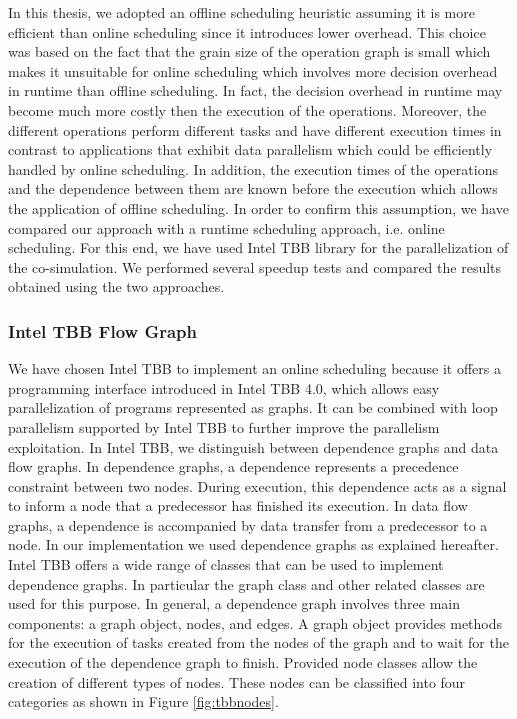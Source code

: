 In this thesis, we adopted an offline scheduling heuristic assuming it is more efficient than online scheduling since it introduces lower overhead. This choice was based on the fact that the grain size of the operation graph is small which makes it unsuitable for online scheduling which involves more decision overhead in runtime than offline scheduling. In fact, the decision overhead in runtime may become much more costly then the execution of the operations. Moreover, the different operations perform different tasks and have different execution times in contrast to applications that exhibit data parallelism which could be efficiently handled by online scheduling. In addition, the execution times of the operations and the dependence between them are known before the execution which allows the application of offline scheduling. In order to confirm this assumption, we have compared our approach with a runtime scheduling approach, i.e. online scheduling. For this end, we have used Intel TBB library for the parallelization of the co-simulation. We performed several speedup tests and compared the results obtained using the two approaches.

\subsubsection{Intel TBB Flow Graph}

We have chosen Intel TBB to implement an online scheduling because it offers a programming interface introduced in Intel TBB 4.0, which allows easy parallelization of programs represented as graphs. 
It can be combined with loop parallelism supported by Intel TBB to further improve the parallelism exploitation. 
In Intel TBB, we distinguish between dependence graphs and data flow graphs.
In dependence graphs, a dependence represents a precedence constraint between two nodes. During execution, this dependence acts as a signal to inform a node that a predecessor has finished its execution. 
In data flow graphs, a dependence is accompanied by data transfer from a predecessor to a node.
In our implementation we used dependence graphs as explained hereafter.
Intel TBB offers a wide range of classes that can be used to implement dependence graphs. In particular the graph class and other related classes are used for this purpose. In general, a dependence graph involves three main components: a graph object, nodes, and edges. A graph object provides methods for the execution of tasks created from the nodes of the graph and to wait for the execution of the dependence graph to finish.
Provided node classes allow the creation of different types of nodes. These nodes can be classified into four categories as shown in Figure \ref{fig:tbbnodes}.

